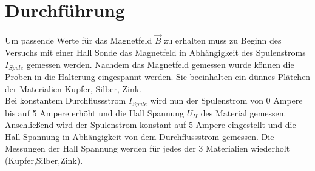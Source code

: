 \section{Durchführung}
\label{sec:Durchfuehrung}
Um passende Werte für das Magnetfeld $\vec{B}$ zu erhalten muss zu Beginn des Versuchs
mit einer Hall Sonde das Magnetfeld in Abhängigkeit des Spulenstroms $I_{Spule}$ gemessen werden.\newline
Nachdem das Magnetfeld gemessen wurde können die Proben in die Halterung eingespannt werden.
Sie beeinhalten ein dünnes Plätchen der Materialien Kupfer, Silber, Zink.\\
Bei konstantem Durchflussstrom $I_{Spule}$ wird nun der Spulenstrom von 0 Ampere bis auf 5 Ampere erhöht und die Hall Spannung $U_H$ 
des Material gemessen.\\
Anschließend wird der Spulenstrom konstant auf 5 Ampere eingestellt und die Hall Spannung in Abhängigkeit von dem Durchflussstrom gemessen.
Die Messungen der Hall Spannung werden für jedes der 3 Materialien wiederholt (Kupfer,Silber,Zink).